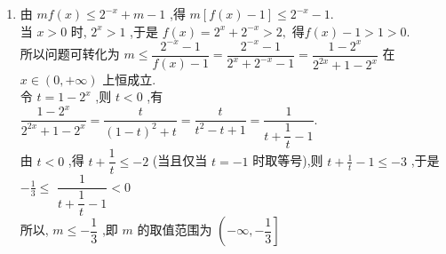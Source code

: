 \begin{enumerate}
\begin{jieda}
\begin{enumerate}
                当 $a > 2$ 时,函数 $y = {t}^{2} - {2at} - 2$ 在 $t \in  \left\lbrack  {2,a}\right\rbrack$ 上是严格减函数,在 $t \in  \lbrack a, + \infty )$ 上是
                严格增函数,所以其值域为 $\left\lbrack  {-{a}^{2} - 2, + \infty }\right)$ .
                综上所述, $g\left( a\right)  = \left\{  \begin{array}{ll} \lbrack 2 - {4a}, + \infty ), & a \leq  2, \\  \left\lbrack  {-{a}^{2} - 2, + \infty }\right) , & a > 2. \end{array}\right.$
                \item 由 ${mf}\left( x\right)  \leq  {2}^{-x} + m - 1$ ,得
                $m\left\lbrack  {f\left( x\right)  - 1}\right\rbrack   \leq  {2}^{-x} - 1.$ \\
                当 $x > 0$ 时, ${2}^{x} > 1$ ,于是
                $f\left( x\right)  = {2}^{x} + {2}^{-x} > 2,$
                得$f\left( x\right)  - 1 > 1 > 0.$\\
                所以问题可转化为
                $m \leq  \dfrac{{2}^{-x} - 1}{f\left( x\right)  - 1} = \dfrac{{2}^{-x} - 1}{{2}^{x} + {2}^{-x} - 1} = \dfrac{1 - {2}^{x}}{{2}^{2x} + 1 - {2}^{x}}$ 在 $x \in  \left( {0, + \infty }\right)$ 上恒成立.\\
                令 $t = 1 - {2}^{x}$ ,则 $t < 0$ ,有
                $\dfrac{1 - {2}^{x}}{{2}^{2x} + 1 - {2}^{x}} = \dfrac{t}{{\left( 1 - t\right) }^{2} + t} = \dfrac{t}{{t}^{2} - t + 1} = \dfrac{1}{t + \dfrac{1}{t} - 1}.$ \\
                由 $t < 0$ ,得 $t + \dfrac{1}{t} \leq   - 2$ (当且仅当 $t =  - 1$ 时取等号),则 $t + \frac{1}{t} - 1 \leq   - 3$ ,于是 $- \frac{1}{3} \leq$
                $\dfrac{1}{t + \dfrac{1}{t} - 1} < 0$ \\
                所以, $m \leq   - \dfrac{1}{3}$ ,即 $m$ 的取值范围为 $\left( {-\infty , - \dfrac{1}{3}}\right\rbrack$
            \end{enumerate}
        \end{jieda}
\end{enumerate}

